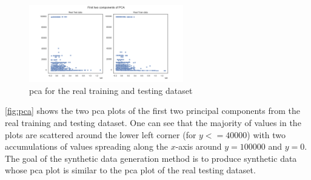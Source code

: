 \begin{figure}[h]
	\centering
	\includegraphics[width=0.6\textwidth]{images/pca/pca.png}
	\caption{\gls{pca} for the real training and testing dataset}
	\label{fig:pca}
\end{figure}

\autoref{fig:pca} shows the two \gls{pca} plots of the first two principal components from the real training and testing dataset.
One can see that the majority of values in the plots are scattered around the lower left corner (for $y<=40000$) with two accumulations of values spreading along the $x$-axis around $y=100000$ and $y=0$.
The goal of the synthetic data generation method is to produce synthetic data whose \gls{pca} plot is similar to the \gls{pca} plot of the real testing dataset.

